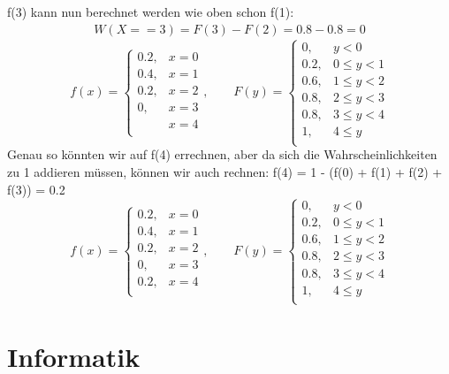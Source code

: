 \documentclass[11pt, a4paper]{article}
\begin{document}
f(3) kann nun berechnet werden wie oben schon f(1):
\begin{align*}
	W(X == 3) = F(3) - F(2) = 0.8 - 0.8 = 0
\end{align*}
\[
f(x) = 
\begin{cases}
	0.2, & x = 0 \\
	0.4, & x = 1 \\
	0.2, & x = 2 \\
	0, & x = 3 \\
	& x = 4 \\
\end{cases}, \qquad
F(y) =
\begin{cases}
	0, & y < 0 \\
	0.2, & 0 \leq y < 1 \\
	0.6, & 1 \leq y < 2 \\
	0.8, & 2 \leq y < 3 \\
	0.8, & 3 \leq y < 4 \\
	1, & 4 \leq y \\
\end{cases}
\]
Genau so könnten wir auf f(4) errechnen, aber da sich die Wahrscheinlichkeiten zu 1 addieren müssen, können wir auch rechnen: f(4) = 1 - (f(0) + f(1) + f(2) + f(3)) = 0.2
\[
f(x) = 
\begin{cases}
	0.2, & x = 0 \\
	0.4, & x = 1 \\
	0.2, & x = 2 \\
	0, & x = 3 \\
	0.2, & x = 4 \\
\end{cases}, \qquad
F(y) =
\begin{cases}
	0, & y < 0 \\
	0.2, & 0 \leq y < 1 \\
	0.6, & 1 \leq y < 2 \\
	0.8, & 2 \leq y < 3 \\
	0.8, & 3 \leq y < 4 \\
	1, & 4 \leq y \\
\end{cases}
\]

\newpage
\section{Informatik}
\end{document}
